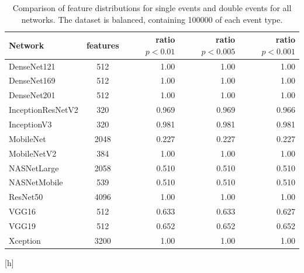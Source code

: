 \documentclass[12pt, notitlepage]{article}
\begin{document}
\begin{table}[h]
    \begin{tabular}{l|c|r|r|r}
	\hline
	 Network           &   features &   ratio $p < 0.01$ &   ratio $p < 0.005$ &   ratio $p < 0.001$ \\
	\hline
	 DenseNet121       &            512 &         1.00  &          1.00   &          1.00   \\
	 DenseNet169       &            512 &         1.00  &          1.00   &          1.00   \\
	 DenseNet201       &            512 &         1.00  &          1.00   &          1.00   \\
	 InceptionResNetV2 &            320 &         0.969 &          0.969  &          0.966  \\
	 InceptionV3       &            320 &         0.981 &          0.981  &          0.981  \\
	 MobileNet         &           2048 &         0.227 &          0.227  &          0.227  \\
	 MobileNetV2       &            384 &         1.00  &          1.00   &          1.00   \\
	 NASNetLarge       &           2058 &         0.510 &          0.510  &          0.510  \\
	 NASNetMobile      &            539 &         0.510 &          0.510  &          0.510  \\
	 ResNet50          &           4096 &         1.00  &          1.00   &          1.00   \\
	 VGG16             &            512 &         0.633 &          0.633  &          0.627  \\
	 VGG19             &            512 &         0.652 &          0.652  &          0.652  \\
	 Xception          &           3200 &         1.00  &          1.00   &          1.00   \\
	\hline
    \end{tabular}
    \caption{Comparison of feature distributions for single events and double events for all networks.
    The dataset is balanced, containing 100000 of each event type.}
    \label{tab:features}
\end{table}[h]
\end{document}

